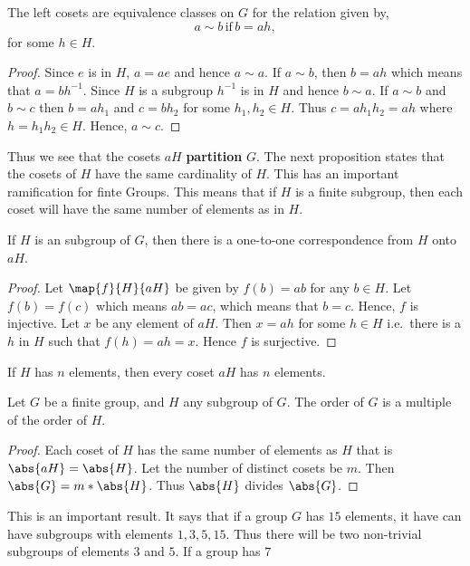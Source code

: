 \begin{Proposition}
    The left cosets are equivalence classes on $G$ for the relation given by,
    \[a \sim b \, \text{if}\, b = ah,\]
    for some $h \in H$.
\end{Proposition}
\begin{proof}
    Since $e$ is in $H$, $a = ae$ and hence $a\sim a$. If $a \sim b$, then $b = ah$ which means that $a =
    bh^{-1}$. Since $H$ is a subgroup $h^{-1}$ is in $H$ and hence $b \sim a$. If $a \sim b$ and $b \sim c$ then
    $b = ah_1$ and $c = bh_2$ for some $h_1,h_2\in H$. Thus $c = ah_1h_2 = ah$ where $h = h_1h_2 \in H$.
    Hence, $a \sim c$.
\end{proof}
Thus we see that the cosets $aH$ \textbf{partition} $G$. The next proposition states that the cosets of $H$
have the same cardinality of $H$. This has an important ramification for finte Groups. This means that if $H$
is a finite subgroup, then each coset will have the same number of elements as in $H$.
\begin{Proposition}
    If $H$ is an subgroup of $G$, then there is a one-to-one correspondence from $H$ onto $aH$.
\end{Proposition}
\begin{proof}
    Let $\map{f}{H}{aH}$ be given by $f(b) = ab$ for any $b \in H$. Let $f(b) = f(c)$ which means $ab = ac$,
    which means that $b = c$. Hence, $f$ is injective. Let $x$ be any element of $aH$. Then $x = ah$ for some
    $h \in H$ i.e.~there is a $h$ in $H$ such that $f(h) = ah = x$. Hence $f$ is surjective.
\end{proof}
\begin{Observation}
    If $H$ has $n$ elements, then every coset $aH$ has $n$ elements.
\end{Observation}
\begin{Theorem}[name=Lagrange theorem]\label{thm:Lagrange_thm}
    Let $G$ be a finite group, and $H$ any subgroup of $G$. The order of $G$ is a multiple of the order of
    $H$.
\end{Theorem}
\begin{proof}
    Each coset of $H$ has the same number of elements as $H$
    that is $\abs{aH} = \abs{H}$.
    Let the number of distinct cosets be $m$. Then $\abs{G} = m*\abs{H}$. Thus $\abs{H}$ divides $\abs{G}$.
\end{proof}
This is an important result. It says that if a group $G$ has $15$ elements, it have can have subgroups with
elements $1,3,5,15$. Thus there will be two non-trivial subgroups of elements $3$ and $5$. If a group has $7$
